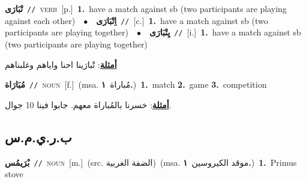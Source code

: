\documentclass[10pt,a4paper,twoside]{article} %
\begin{document}
\begin{multicols}{2}
{\setlength\topsep{0pt}\textbf{\foreignlanguage{arabic}{تْبَارَى}}\ {\color{gray}\texttt{//}\color{black}}\ \textsc{verb}\ [p.]\ \textbf{1.}~have a match against sb (two participants are playing against each other)\ \ $\bullet$\ \ \setlength\topsep{0pt}\textbf{\foreignlanguage{arabic}{اِتْبَارَى}}\ {\color{gray}\texttt{//}\color{black}}\ [c.]\ \textbf{1.}~have a match against sb (two participants are playing together)\ \ $\bullet$\ \ \setlength\topsep{0pt}\textbf{\foreignlanguage{arabic}{يِتْبَارَى}}\ {\color{gray}\texttt{//}\color{black}}\ [i.]\ \textbf{1.}~have a match against sb (two participants are playing together)\  \begin{flushright}\color{gray}\foreignlanguage{arabic}{\textbf{\underline{\foreignlanguage{arabic}{أمثلة}}}: تْبارَينا احنا واياهم وغلبناهم}\end{flushright}\color{black}} \vspace{2mm}

{\setlength\topsep{0pt}\textbf{\foreignlanguage{arabic}{مُبَارَاة}}\ {\color{gray}\texttt{//}\color{black}}\ \textsc{noun}\ [f.]\ \color{gray}(msa. \foreignlanguage{arabic}{مُباراة}~\foreignlanguage{arabic}{\textbf{١.}})\color{black}\ \textbf{1.}~match  \textbf{2.}~game  \textbf{3.}~competition\  \begin{flushright}\color{gray}\foreignlanguage{arabic}{\textbf{\underline{\foreignlanguage{arabic}{أمثلة}}}: خسرنا بالمُباراة معهم. جابوا فينا 10 جوال.}\end{flushright}\color{black}} \vspace{2mm}

\vspace{-3mm}
\subsection*{\color{blue}\foreignlanguage{arabic}{ب.ر.ي.م.س}\color{blue}{ (ntws)}} 

{\setlength\topsep{0pt}\textbf{\foreignlanguage{arabic}{بْرَيمُس}}\ {\color{gray}\texttt{//}\color{black}}\ \textsc{noun}\ [m.]\ (src. \color{gray}\foreignlanguage{arabic}{الضفة الغربية}\color{black})\ \color{gray}(msa. \foreignlanguage{arabic}{موقد الكيروسين}~\foreignlanguage{arabic}{\textbf{١.}})\color{black}\ \textbf{1.}~Primus stove\ } \vspace{2mm}


\end{multicols}
\end{document}
